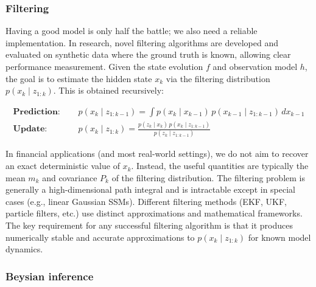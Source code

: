 \documentclass{article}
\begin{document}
\subsubsection{Filtering}

Having a good model is only half the battle; we also need a reliable implementation. In research, novel filtering algorithms are developed and evaluated on synthetic data where the ground truth is known, allowing clear performance measurement. Given the state evolution $f$ and observation model $h$, the goal is to estimate the hidden state $x_k$ via the filtering distribution $p(x_k \mid z_{1:k})$. This is obtained recursively:

\begin{equation}
\begin{split}
   \textbf{Prediction: } & \quad p(x_k \mid z_{1:k-1}) = \int p(x_k \mid x_{k-1}) \, p(x_{k-1} \mid z_{1:k-1}) \, dx_{k-1} \\[1ex]
   \textbf{Update: }     & \quad p(x_k \mid z_{1:k}) = \frac{p(z_k \mid x_k) \, p(x_k \mid z_{1:k-1})}{p(z_k \mid z_{1:k-1})}
\end{split}
\end{equation}

In financial applications (and most real-world settings), we do not aim to recover an exact deterministic value of $x_k$. Instead, the useful quantities are typically the mean $m_k$ and covariance $P_k$ of the filtering distribution. The filtering problem is generally a high-dimensional path integral and is intractable except in special cases (e.g., linear Gaussian SSMs). Different filtering methods (EKF, UKF, particle filters, etc.) use distinct approximations and mathematical frameworks. The key requirement for any successful filtering algorithm is that it produces numerically stable and accurate approximations to $p(x_k \mid z_{1:k})$ for known model dynamics.

\subsubsection{Beysian inference}
\end{document}
